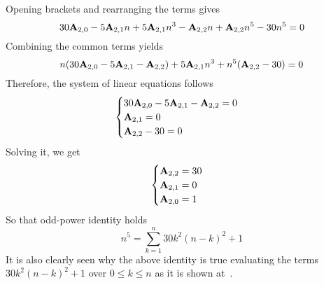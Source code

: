 Opening brackets and rearranging the terms gives
\begin{equation*}
    30 {\mathbf{A}} \sb{2,0} - 5 {\mathbf{A}} \sb{2,1} n + 5 {\mathbf{A}} \sb{2,1} n^3 - {\mathbf{A}} \sb{2,2} n + {\mathbf{A}} \sb{2,2} n^5 - 30n^5 = 0
\end{equation*}
Combining the common terms yields
\begin{equation*}
    n (30 {\mathbf{A}} \sb{2,0} - 5 {\mathbf{A}} \sb{2,1} - {\mathbf{A}} \sb{2,2}) + 5 {\mathbf{A}} \sb{2,1} n^3 + n^5 ({\mathbf{A}} \sb{2,2} - 30) = 0
\end{equation*}
Therefore, the system of linear equations follows
\begin{equation*}
    \begin{cases}
        30 {\mathbf{A}} \sb{2,0} - 5 {\mathbf{A}} \sb{2,1} - {\mathbf{A}} \sb{2,2} = 0 \\
        {\mathbf{A}} \sb{2,1} = 0 \\
        {\mathbf{A}} \sb{2,2} - 30 = 0
    \end{cases}
\end{equation*}
Solving it, we get
\begin{equation*}
    \begin{cases}
        {\mathbf{A}} \sb{2,2} = 30 \\
        {\mathbf{A}} \sb{2,1} = 0 \\
        {\mathbf{A}} \sb{2,0} = 1
    \end{cases}
\end{equation*}
So that odd-power identity holds
\begin{equation*}
    n^5 = \sum_{k=1}^{n} 30k^2(n-k)^2 + 1
\end{equation*}
It is also clearly seen
why the above identity is true evaluating the terms $30k^2(n-k)^2 + 1$ over $0 \leq k \leq n$ as
it is shown at~\cite{kolosov2018fifth}.

